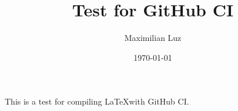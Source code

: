 \documentclass{article}
\author{Maximilian Luz}
\title{Test for GitHub CI}
\date{\today}
\begin{document}
\maketitle

This is a test for compiling \LaTeX with GitHub CI.
\end{document}
